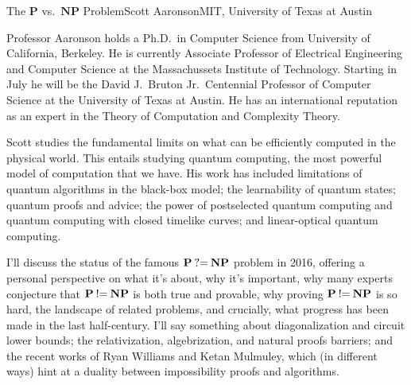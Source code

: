 \documentclass{hrumc}
\begin{document}
\vspace*{5ex}
\begin{plenary}{The $\mathbf{P}$ vs.\ $\mathbf{NP}$ Problem}{Scott Aaronson}{MIT, University of Texas at Austin}{Professor Aaronson 
holds a Ph.D.\ in Computer Science from University of California, Berkeley.
He is currently Associate Professor of Electrical Engineering and 
Computer Science
at the Massachussets Institute of Technology. 
Starting in July he will be the 
David J.~Bruton Jr.\ Centennial Professor of Computer Science at the 
University of Texas at Austin. 
He has an international reputation as an expert in the Theory of Computation 
and Complexity Theory.

Scott studies the fundamental limits on what can be efficiently computed in the physical world. This entails studying quantum computing, the most powerful model of computation that we have. His work has included limitations of quantum algorithms in the black-box model; the learnability of quantum states; quantum proofs and advice; the power of postselected quantum computing and quantum computing with closed timelike curves; and linear-optical quantum computing.}

I'll discuss the status of the famous 
$\mathbf{P}\mathbin{\hbox{?=}}\mathbf{NP}$ 
problem in 2016, offering
a personal perspective on what it's about, why it's important, why
many experts conjecture that $\mathbf{P}\mathbin{\hbox{!=}}\mathbf{NP}$ is both true and provable, why
proving $\mathbf{P}\mathbin{\hbox{!=}}\mathbf{NP}$ is so hard, the landscape of related problems, and
crucially, what progress has been made in the last half-century.  I'll
say something about diagonalization and circuit lower bounds; the
relativization, algebrization, and natural proofs barriers; and the
recent works of Ryan Williams and Ketan Mulmuley, which (in different
ways) hint at a duality between impossibility proofs and algorithms.
\end{plenary}
\vspace*{1ex plus 1fill}







\end{document}
